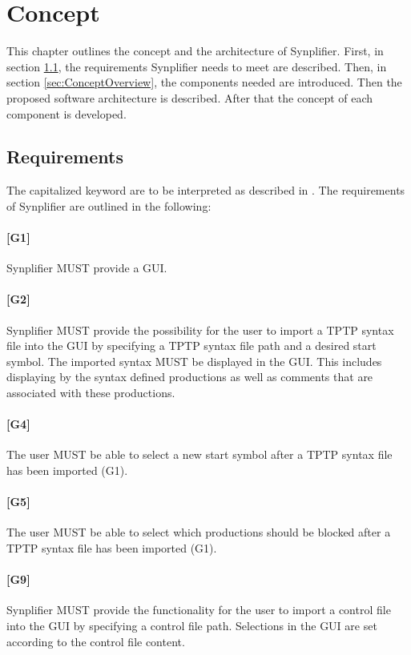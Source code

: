 
\chapter{Concept}\label{cha:Concept}
This chapter outlines the concept and the architecture of \ac{Synplifier}.
First, in section \ref{sec:ConceptRequirements}, the requirements \ac{Synplifier} needs to meet are described.
Then, in section \ref{sec:ConceptOverview}, the components needed are introduced.
Then the proposed software architecture is described. After that the concept of each component is developed.

\section{Requirements}\label{sec:ConceptRequirements}

The capitalized keyword are to be interpreted as described in \cite{Bradner.1997}.
The requirements of \ac{Synplifier} are outlined in the following:\\
\subsubsection{[G1]}\label{G1}
\ac{Synplifier} MUST provide a GUI.
\subsubsection{[G2]}\label{G2}
\ac{Synplifier} MUST provide the possibility for the user to import a \ac{TPTP} syntax file into the GUI by specifying a \ac{TPTP} syntax file path and a desired start symbol. The imported syntax MUST be displayed in the GUI. This includes displaying by the syntax defined productions as well as comments that are associated with these productions.
\subsubsection{[G4]}\label{G4}
The user MUST be able to select a new start symbol after a \ac{TPTP} syntax file has been imported (G1).
\subsubsection{[G5]}\label{G5}
The user MUST be able to select which productions should be blocked after a \ac{TPTP} syntax file has been imported (G1).
\subsubsection{[G9]}\label{G9}
\ac{Synplifier} MUST provide the functionality for the user to import a control file into the GUI by specifying a control file path. Selections in the GUI are set according to the control file content.

